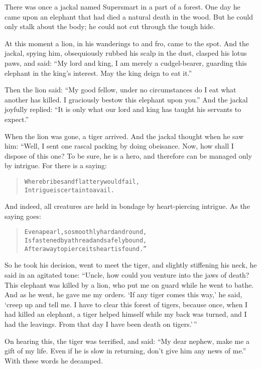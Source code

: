 \documentclass[article, twoside, 14pt]{memoir}
\renewenvironment{verbatim}{%
\begin{quote}%
\vskip -10pt%
\begin{alltt}\normalfont\large}{\end{alltt}%
\end{quote}%
\vskip -10pt
} %
\begin{document}
\label{s76}

There was once a jackal named Supersmart in a part of a forest. One
day he came upon an elephant that had died a natural death in the
wood. But he could only stalk about the body; he could not cut
through the tough hide.

At this moment a lion, in his wanderings to and fro, came to
the spot. And the jackal, spying him, obsequiously rubbed his scalp
in the dust, clasped his lotus paws, and said:
``My lord and king, I am merely a cudgel-bearer, guarding this elephant in the king's interest. May the king deign to eat it.''

Then the lion said:
``My good fellow, under no circumstances do I eat what another has killed. I graciously bestow this elephant upon you.''
And the jackal joyfully replied:
``It is only what our lord and king has taught his servants to expect.''

When the lion was gone, a tiger arrived. And the jackal thought
when he saw him: “Well, I sent one rascal packing by doing
obeisance. Now, how shall I dispose of this one? To be sure, he is
a hero, and therefore can be managed only by intrigue. For there is
a saying:

\begin{verbatim}
Where bribes and flattery would fail,
Intrigue is certain to avail.
\end{verbatim}
And indeed, all creatures are held in bondage by heart-piercing
intrigue. As the saying goes:

\begin{verbatim}
Even a pearl, so smoothly hard and round,
Is fastened by a thread and safely bound,
After a way to pierce its heart is found.”
\end{verbatim}
So he took his decision, went to meet the tiger, and slightly
stiffening his neck, he said in an agitated tone:
``Uncle, how could you venture into the jaws of death? This elephant was killed by a lion, who put me on guard while he went to bathe. And as he went, he gave me my orders. `If any tiger comes this way,' he said, `creep up and tell me. I have to clear this forest of tigers, because once, when I had killed an elephant, a tiger helped himself while my back was turned, and I had the leavings. From that day I have been death on tigers.'\,''

On hearing this, the tiger was terrified, and said:
``My dear nephew, make me a gift of my life. Even if he is slow in returning, don't give him any news of me.''
With these words he decamped.
\end{document}
